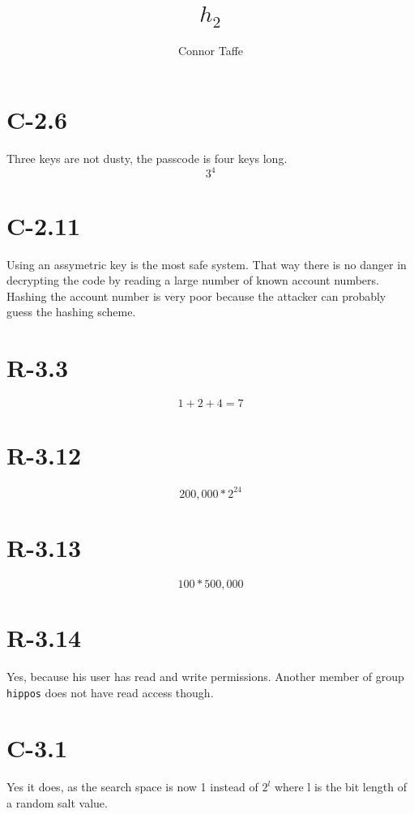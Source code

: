 \documentclass{article}
\title{$h_{2}$}
\author{Connor Taffe}
\begin{document}
  \maketitle

  \section{C-2.6}
    Three keys are not dusty, the passcode is four keys long.
    \begin{equation}
      3^4
    \end{equation}

  \section{C-2.11}
    Using an assymetric key is the most safe system. That way there is no danger in decrypting the code by reading a large number of known account numbers. Hashing the account number is very poor because the attacker can probably guess the hashing scheme.

  \section{R-3.3}
    \begin{equation}
      1+2+4=7
    \end{equation}
  \section{R-3.12}
    \begin{equation}
      200,000*2^{24}
    \end{equation}
  \section{R-3.13}
    \begin{equation}
      100*500,000
    \end{equation}
  \section{R-3.14}
    Yes, because his user has read and write permissions. Another member of group {\tt hippos} does not have read access though.
  \section{C-3.1}
    Yes it does, as the search space is now 1 instead of $2^l$ where l is the bit length of a random salt value.
\end{document}
